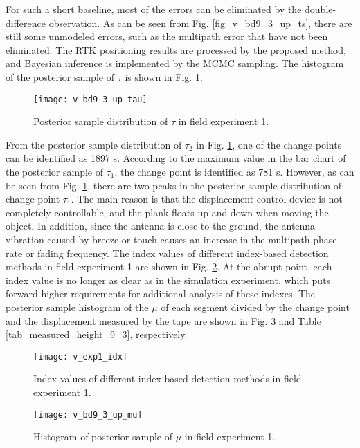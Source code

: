 \documentclass[final,3p,times]{elsarticle}
\begin{document}
	For such a short baseline, most of the errors can be eliminated by the double-difference observation. 
	As can be seen from Fig. \ref{fig_v_bd9_3_up_ts}, there are still some unmodeled errors, such as the multipath error that have not been eliminated. 
	The RTK positioning results are processed by the proposed method, and Bayesian inference is implemented by the MCMC sampling. 
	The histogram of the posterior sample of $\tau$ is shown in Fig. \ref{fig_v_bd9_3_up_tau}.
	\begin{figure}[htbp]
		\centering
		\texttt{[image: v\_bd9\_3\_up\_tau]}
		\caption{Posterior sample distribution of $\tau$ in field experiment 1.}
		\label{fig_v_bd9_3_up_tau}
	\end{figure} 
	From the posterior sample distribution of $\tau_2$ in Fig. \ref{fig_v_bd9_3_up_tau}, one of the change points can be identified as 1897 s. 
	According to the maximum value in the bar chart of the posterior sample of $\tau_1$, the change point is identified as 781 s.
	However, as can be seen from Fig. \ref{fig_v_bd9_3_up_tau}, there are two peaks in the posterior sample distribution of change point $\tau_1$.
	The main reason is that the displacement control device is not completely controllable, and the plank floats up and down when moving the object. 
	In addition, since the antenna is close to the ground, the antenna vibration caused by breeze or touch causes an increase in the multipath phase rate or fading frequency\cite{kelly2003characterization}. 
	The index values of different index-based detection methods in field experiment 1 are shown in Fig. \ref{fig_v_exp1_idx}. At the abrupt point, each index value is no longer as clear as in the simulation experiment, which puts forward higher requirements for additional analysis of these indexes.
	The posterior sample histogram of the $\mu$ of each segment divided by the change point and the displacement measured by the tape are shown in Fig. \ref{fig_v_bd9_3_up_mu} and Table \ref{tab_measured_height_9_3}, respectively.
	\begin{figure}[htbp]
		\centering
		\texttt{[image: v\_exp1\_idx]}
		\caption{Index values of different index-based detection methods in field experiment 1.}
		\label{fig_v_exp1_idx}
	\end{figure} 
	\begin{figure}[htbp]
		\centering
		\texttt{[image: v\_bd9\_3\_up\_mu]}
		\caption{Histogram of posterior sample of $\mu$ in field experiment 1.}
		\label{fig_v_bd9_3_up_mu}
	\end{figure} 
\end{document}
